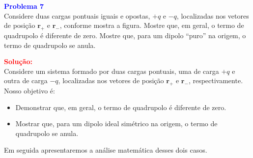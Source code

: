 \documentclass[a4paper,12pt]{article}
\begin{document}
\begin{flushleft}
\textbf{\textcolor{blue}{\Large Problema 7}}\\

Considere duas cargas pontuais iguais e opostas, \( +q \) e \( -q \), localizadas nos vetores 
de posição \( \mathbf{r}_+ \) e \( \mathbf{r}_- \), conforme mostra a figura. Mostre que, em geral, 
o termo de quadrupolo é diferente de zero. Mostre que, para um dipolo “puro” na origem, o termo de 
quadrupolo se anula.

\begin{center}
\end{center}

\textcolor{red}{\textbf{Solução:}}\\


Considere um sistema formado por duas cargas pontuais, uma de carga \( +q \) e outra 
de carga \( -q \), localizadas nos vetores de posição \( \mathbf{r}_+ \) e \( \mathbf{r}_- \), 
respectivamente. Nosso objetivo é:

\begin{itemize}
    \item Demonstrar que, em geral, o \colorbox{red!15}{termo de quadrupolo é diferente de zero}.
    \item Mostrar que, para um \colorbox{yellow!25}{dipolo ideal} simétrico na origem, o \colorbox{yellow!25}{termo de 
    quadrupolo se anula.}
\end{itemize}

Em seguida apresentaremos a análise matemática desses dois casos.


\end{flushleft}
\end{document}
